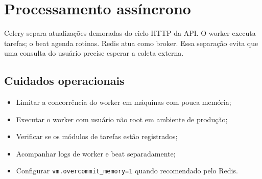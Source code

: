 \chapter{Processamento assíncrono}

Celery separa atualizações demoradas do ciclo HTTP da API. O worker executa tarefas; o beat agenda rotinas. Redis atua como broker. Essa separação evita que uma consulta do usuário precise esperar a coleta externa.

\section{Cuidados operacionais}

\begin{itemize}[leftmargin=*,itemsep=0.25em]
\item Limitar a concorrência do worker em máquinas com pouca memória;
\item Executar o worker com usuário não root em ambiente de produção;
\item Verificar se os módulos de tarefas estão registrados;
\item Acompanhar logs de worker e beat separadamente;
\item Configurar \texttt{vm.overcommit\_memory=1} quando recomendado pelo Redis.
\end{itemize}
